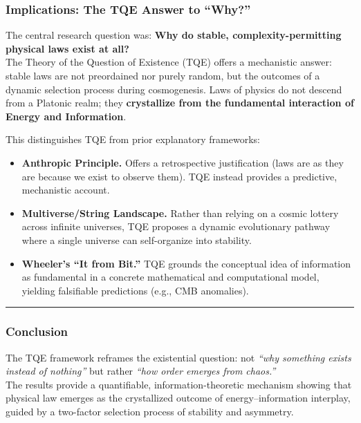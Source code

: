 \subsubsection{Implications: The TQE Answer to
``Why?''}\label{implications-the-tqe-answer-to-why}

The central research question was: \textbf{Why do stable,
complexity-permitting physical laws exist at all?}\\
The Theory of the Question of Existence (TQE) offers a mechanistic
answer: stable laws are not preordained nor purely random, but the
outcomes of a dynamic selection process during cosmogenesis. Laws of
physics do not descend from a Platonic realm; they \textbf{crystallize
from the fundamental interaction of Energy and Information}.

This distinguishes TQE from prior explanatory frameworks:

\begin{itemize}
\tightlist
\item
  \textbf{Anthropic Principle.} Offers a retrospective justification
  (laws are as they are because we exist to observe them). TQE instead
  provides a predictive, mechanistic account.
\item
  \textbf{Multiverse/String Landscape.} Rather than relying on a cosmic
  lottery across infinite universes, TQE proposes a dynamic evolutionary
  pathway where a single universe can self-organize into stability.
\item
  \textbf{Wheeler's ``It from Bit.''} TQE grounds the conceptual idea of
  information as fundamental in a concrete mathematical and
  computational model, yielding falsifiable predictions (e.g., CMB
  anomalies).
\end{itemize}

\begin{center}\rule{0.5\linewidth}{0.5pt}\end{center}

\subsubsection{Conclusion}\label{conclusion}

The TQE framework reframes the existential question: not \emph{``why
something exists instead of nothing''} but rather \emph{``how order
emerges from chaos.''}\\
The results provide a quantifiable, information-theoretic mechanism
showing that physical law emerges as the crystallized outcome of
energy--information interplay, guided by a two-factor selection process
of stability and asymmetry.

